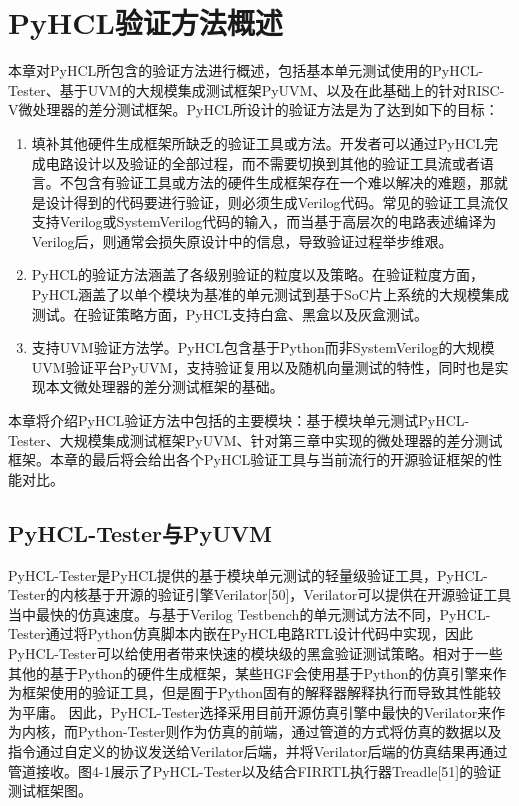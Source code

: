 \chapter{PyHCL验证方法概述}

本章对PyHCL所包含的验证方法进行概述，包括基本单元测试使用的PyHCL-Tester、基于UVM的大规模集成测试框架PyUVM、以及在此基础上的针对RISC-V微处理器的差分测试框架。PyHCL所设计的验证方法是为了达到如下的目标：

\begin{enumerate}
	\item 填补其他硬件生成框架所缺乏的验证工具或方法。开发者可以通过PyHCL完成电路设计以及验证的全部过程，而不需要切换到其他的验证工具流或者语言。不包含有验证工具或方法的硬件生成框架存在一个难以解决的难题，那就是设计得到的代码要进行验证，则必须生成Verilog代码。常见的验证工具流仅支持Verilog或SystemVerilog代码的输入，而当基于高层次的电路表述编译为Verilog后，则通常会损失原设计中的信息，导致验证过程举步维艰。
	\item PyHCL的验证方法涵盖了各级别验证的粒度以及策略。在验证粒度方面，PyHCL涵盖了以单个模块为基准的单元测试到基于SoC片上系统的大规模集成测试。在验证策略方面，PyHCL支持白盒、黑盒以及灰盒测试。
	\item 支持UVM验证方法学。PyHCL包含基于Python而非SystemVerilog的大规模UVM验证平台PyUVM，支持验证复用以及随机向量测试的特性，同时也是实现本文微处理器的差分测试框架的基础。
\end{enumerate}

本章将介绍PyHCL验证方法中包括的主要模块：基于模块单元测试PyHCL-Tester、大规模集成测试框架PyUVM、针对第三章中实现的微处理器的差分测试框架。本章的最后将会给出各个PyHCL验证工具与当前流行的开源验证框架的性能对比。

\section{PyHCL-Tester与PyUVM}

PyHCL-Tester是PyHCL提供的基于模块单元测试的轻量级验证工具，PyHCL-Tester的内核基于开源的验证引擎Verilator[50]，Verilator可以提供在开源验证工具当中最快的仿真速度。与基于Verilog Testbench的单元测试方法不同，PyHCL-Tester通过将Python仿真脚本内嵌在PyHCL电路RTL设计代码中实现，因此PyHCL-Tester可以给使用者带来快速的模块级的黑盒验证测试策略。相对于一些其他的基于Python的硬件生成框架，某些HGF会使用基于Python的仿真引擎来作为框架使用的验证工具，但是囿于Python固有的解释器解释执行而导致其性能较为平庸。 因此，PyHCL-Tester选择采用目前开源仿真引擎中最快的Verilator来作为内核，而Python-Tester则作为仿真的前端，通过管道的方式将仿真的数据以及指令通过自定义的协议发送给Verilator后端，并将Verilator后端的仿真结果再通过管道接收。图4-1展示了PyHCL-Tester以及结合FIRRTL执行器Treadle[51]的验证测试框架图。

